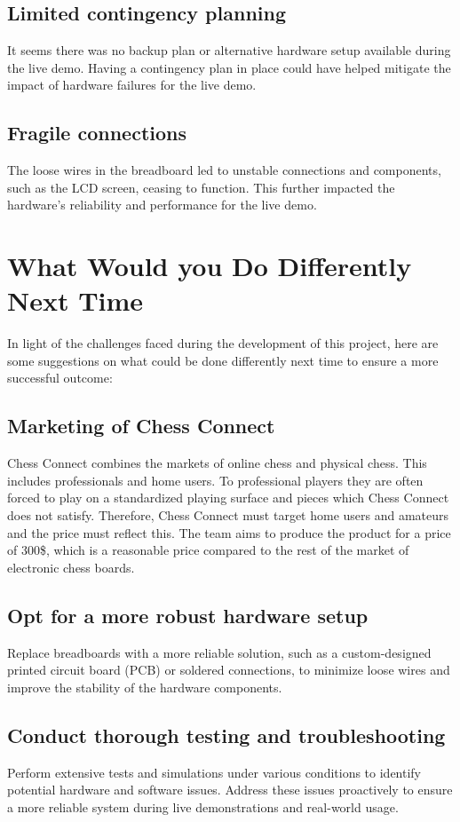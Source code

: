 \documentclass{article}
\begin{document}
\subsection{Limited contingency planning}
It seems there was no backup plan or alternative hardware setup available during the live demo. Having a contingency plan in place could have helped mitigate the impact of hardware failures for the live demo.

\subsection{Fragile connections}
The loose wires in the breadboard led to unstable connections and components, such as the LCD screen, ceasing to function. This further impacted the hardware's reliability and performance for the live demo.

\section{What Would you Do Differently Next Time}

In light of the challenges faced during the development of this project, here are some suggestions on what could be done differently next time to ensure a more successful outcome:

\subsection{Marketing of Chess Connect}
Chess Connect combines the markets of online chess and physical chess. This includes professionals
and home users. To professional players they are often forced to play on a standardized playing
surface and pieces which Chess Connect does not satisfy. Therefore, Chess Connect must target 
home users and amateurs and the price must reflect this. The team aims to produce the product 
for a price of 300\$, which is a reasonable price compared to the rest of the market of electronic
chess boards. 

\subsection{Opt for a more robust hardware setup}
Replace breadboards with a more reliable solution, such as a custom-designed printed circuit board (PCB) or soldered connections, to minimize loose wires and improve the stability of the hardware components.

\subsection{Conduct thorough testing and troubleshooting}
Perform extensive tests and simulations under various conditions to identify potential hardware and software issues. Address these issues proactively to ensure a more reliable system during live demonstrations and real-world usage.
\end{document}
